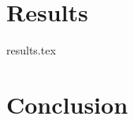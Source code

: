 \documentclass[a4paper,11pt]{report}
\begin{document}
\chapter{Results}
{results.tex}

\chapter{Conclusion}




\clearpage
{}
%

 

\end{document}
